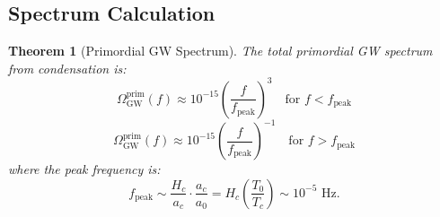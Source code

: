 \documentclass[11pt,a4paper]{article}
\newtheorem{theorem}{Theorem}[section]
\theoremstyle{definition}
\theoremstyle{remark}
\begin{document}
\subsection{Spectrum Calculation}
\label{sec:spectrum_calculation}

\begin{theorem}[Primordial GW Spectrum]
\label{thm:primordial_spectrum}
The total primordial GW spectrum from condensation is:
\begin{equation}
\label{eq:primordial_spectrum}
\boxed{\Omega_{\mathrm{GW}}^{\mathrm{prim}}(f) \approx 10^{-15}\left(\frac{f}{f_{\mathrm{peak}}}\right)^3 \quad \text{for } f < f_{\mathrm{peak}}}
\end{equation}
\begin{equation}
\boxed{\Omega_{\mathrm{GW}}^{\mathrm{prim}}(f) \approx 10^{-15}\left(\frac{f}{f_{\mathrm{peak}}}\right)^{-1} \quad \text{for } f > f_{\mathrm{peak}}}
\end{equation}
where the peak frequency is:
\begin{equation}
f_{\mathrm{peak}} \sim \frac{H_c}{a_c} \cdot \frac{a_c}{a_0} = H_c\left(\frac{T_0}{T_c}\right) \sim 10^{-5} \text{ Hz}.
\end{equation}
\end{theorem}
\end{document}
